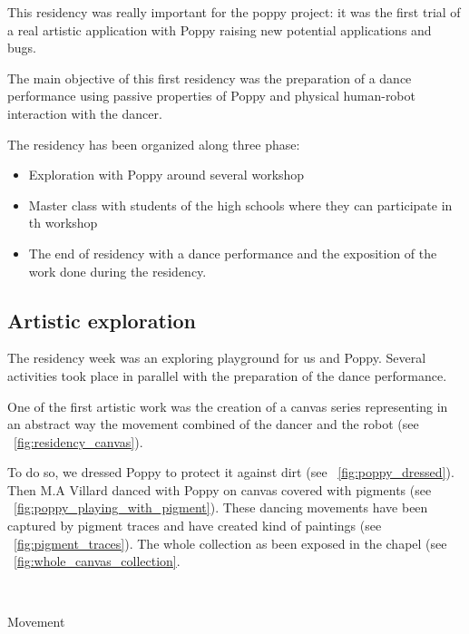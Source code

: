 This residency was really important for the poppy project: it was the first trial of a real artistic application with Poppy raising new potential applications and bugs.

The main objective of this first residency was the preparation of a dance performance using passive properties of Poppy and physical human-robot interaction with the dancer.


The residency has been organized along three phase:

\begin{itemize}
    \item Exploration with Poppy around several workshop
    \item Master class with students of the high schools where they can participate in th workshop
    \item The end of residency with a dance performance and the exposition of the work done during the residency.
\end{itemize}


\subsection{Artistic exploration} %

The residency week was an exploring playground for us and Poppy. Several activities took place in parallel with the preparation of the dance performance.

One of the first artistic work was the creation of a canvas series representing in an abstract way the movement combined of the dancer and the robot (see \figurename~\ref{fig:residency_canvas}).

To do so, we dressed Poppy to protect it against dirt (see \figurename~\ref{fig:poppy_dressed}). Then M.A Villard danced with Poppy on canvas covered with pigments (see \figurename~\ref{fig:poppy_playing_with_pigment}). These dancing movements have been captured by pigment traces and have created kind of paintings (see \figurename~\ref{fig:pigment_traces}). The whole collection as been exposed in the chapel (see \figurename~\ref{fig:whole_canvas_collection}.

\begin{NFfigure}
\centering
    \hfil
    \\
    \hfil
    \caption{Movement }
    \label{fig:residency_canvas}
\end{NFfigure}


